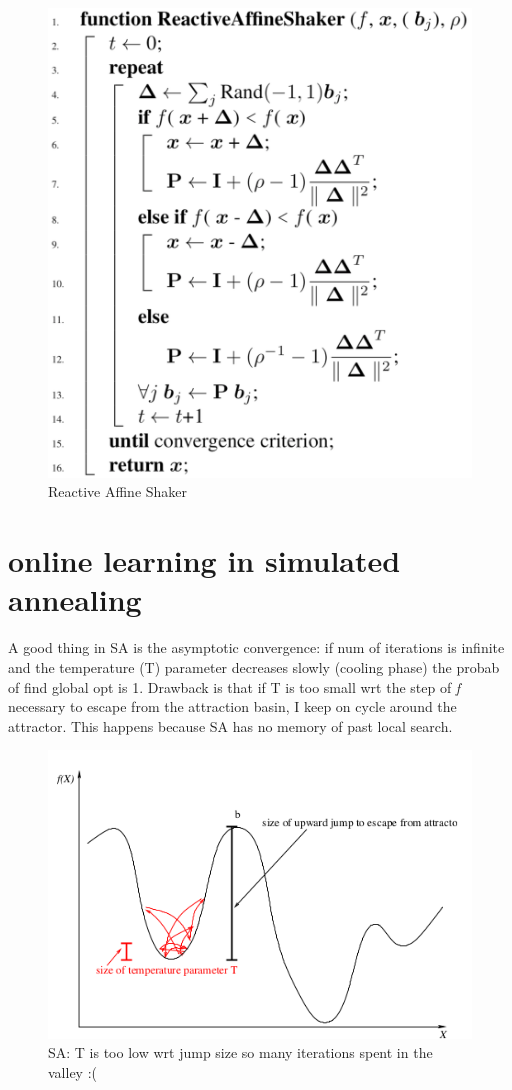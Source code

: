 \documentclass[11pt]{article}
\begin{document}
\begin{figure}[H]
\includegraphics[scale=0.25]{ras}
\caption{Reactive Affine Shaker}
\centering
\label{fig:ras}
\end{figure}

\section{online learning in simulated annealing}
A good thing in SA is the asymptotic convergence: if num of iterations is infinite and the temperature (T) parameter decreases slowly (cooling phase) the probab of find global opt is 1. Drawback is that if T is too small wrt the step of \textit{f} necessary to escape from the attraction basin, I keep on cycle around the attractor. This happens because SA has no memory of past local search. 

\begin{figure}[H]
\includegraphics[scale=0.40]{sa}
\caption{SA: T is too low wrt jump size so many iterations spent in the valley :( }
\centering
\end{figure}
\end{document}
